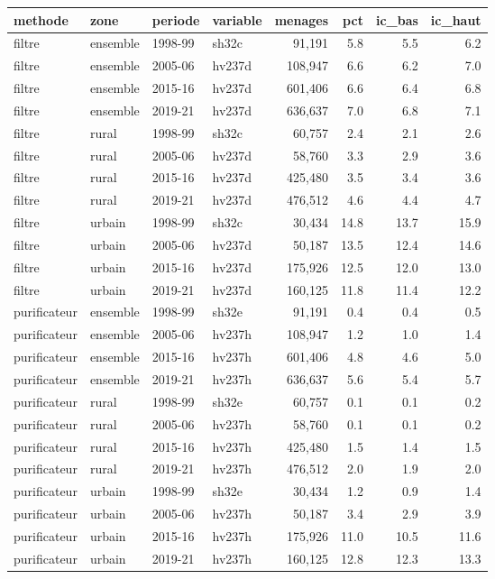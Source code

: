 \begin{tabular}{llllrrrr}
\toprule
methode & zone & periode & variable & menages & pct & ic\_bas & ic\_haut
\\
\midrule
filtre & ensemble & 1998-99 & sh32c & 91,191 & 5.8 & 5.5 & 6.2 \\
filtre & ensemble & 2005-06 & hv237d & 108,947 & 6.6 & 6.2 & 7.0 \\
filtre & ensemble & 2015-16 & hv237d & 601,406 & 6.6 & 6.4 & 6.8 \\
filtre & ensemble & 2019-21 & hv237d & 636,637 & 7.0 & 6.8 & 7.1 \\
filtre & rural & 1998-99 & sh32c & 60,757 & 2.4 & 2.1 & 2.6 \\
filtre & rural & 2005-06 & hv237d & 58,760 & 3.3 & 2.9 & 3.6 \\
filtre & rural & 2015-16 & hv237d & 425,480 & 3.5 & 3.4 & 3.6 \\
filtre & rural & 2019-21 & hv237d & 476,512 & 4.6 & 4.4 & 4.7 \\
filtre & urbain & 1998-99 & sh32c & 30,434 & 14.8 & 13.7 & 15.9 \\
filtre & urbain & 2005-06 & hv237d & 50,187 & 13.5 & 12.4 & 14.6 \\
filtre & urbain & 2015-16 & hv237d & 175,926 & 12.5 & 12.0 & 13.0 \\
filtre & urbain & 2019-21 & hv237d & 160,125 & 11.8 & 11.4 & 12.2 \\
purificateur & ensemble & 1998-99 & sh32e & 91,191 & 0.4 & 0.4 & 0.5 \\
purificateur & ensemble & 2005-06 & hv237h & 108,947 & 1.2 & 1.0 & 1.4 \\
purificateur & ensemble & 2015-16 & hv237h & 601,406 & 4.8 & 4.6 & 5.0 \\
purificateur & ensemble & 2019-21 & hv237h & 636,637 & 5.6 & 5.4 & 5.7 \\
purificateur & rural & 1998-99 & sh32e & 60,757 & 0.1 & 0.1 & 0.2 \\
purificateur & rural & 2005-06 & hv237h & 58,760 & 0.1 & 0.1 & 0.2 \\
purificateur & rural & 2015-16 & hv237h & 425,480 & 1.5 & 1.4 & 1.5 \\
purificateur & rural & 2019-21 & hv237h & 476,512 & 2.0 & 1.9 & 2.0 \\
purificateur & urbain & 1998-99 & sh32e & 30,434 & 1.2 & 0.9 & 1.4 \\
purificateur & urbain & 2005-06 & hv237h & 50,187 & 3.4 & 2.9 & 3.9 \\
purificateur & urbain & 2015-16 & hv237h & 175,926 & 11.0 & 10.5 & 11.6 \\
purificateur & urbain & 2019-21 & hv237h & 160,125 & 12.8 & 12.3 & 13.3 \\
\bottomrule
\end{tabular}
